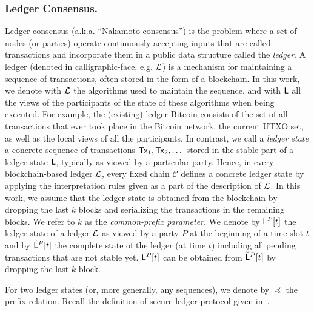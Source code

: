 \subsubsection{Ledger Consensus.}
Ledger consensus (a.k.a. ``Nakamoto consensus'') is the problem where a set of nodes
(or parties) operate continuously accepting inputs
that are called transactions and incorporate them in a public data
structure called the {\em ledger}.
A ledger (denoted in calligraphic-face, e.g. $\mathcal{L}$) is a mechanism for maintaining a sequence of transactions, often
stored in the form of a blockchain. In this work, we denote with $\mathcal{L}$
the algorithms used to maintain the sequence, and with $\mathsf{L}$ all the views of the
participants of the state of these algorithms when being executed. For example, the (existing) ledger Bitcoin
consists of the set of all transactions that ever took place in the Bitcoin network, the current UTXO set, as
well as the local views of all the participants.
In contrast, we call a \emph{ledger state} a concrete sequence of transactions $\mathsf{Tx}_1,\mathsf{Tx}_2,\dots$ stored in the stable
part of a ledger state $\mathsf{L}$, typically as viewed by a particular party. Hence, in every blockchain-based ledger $\mathcal{L}$,
every fixed chain $\mathcal{C}$ defines a concrete ledger state by applying the interpretation rules given as a part of the
description of $\mathcal{L}$. In this work, we assume that the ledger state is obtained from the blockchain by dropping the last $k$ blocks
and serializing the transactions in the remaining blocks. We refer to $k$ as the \emph{common-prefix parameter}.
We denote by $\mathsf{L}^P[t]$ the ledger state of a ledger $\mathcal{L}$ as viewed by a party $P$ at the beginning of a time slot $t$
and by ${\check {\mathsf{L}}}^{P}[t]$ the complete state of the ledger (at time $t$) including all pending transactions that are not stable yet. $\mathsf{L}^P[t]$ can be obtained from  ${\check {\mathsf{L}}}^{P}[t]$ by dropping the last $k$ block.


For two ledger states (or, more generally, any sequences), we denote by $\preceq$ the prefix relation.
Recall the definition of secure ledger protocol given in~\cite{RSA:GarKia20}.



